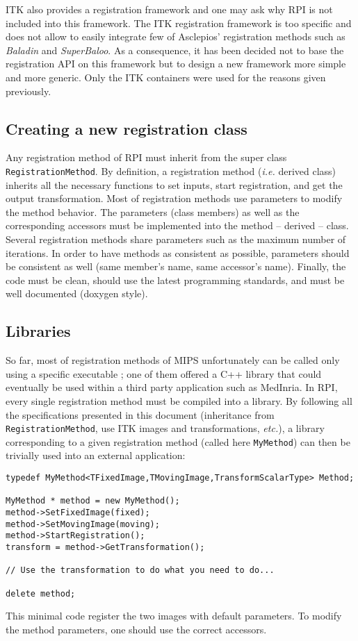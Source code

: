 ITK also provides a registration framework and one may ask why RPI is not included into this framework. The ITK registration framework is too specific and does not allow to easily integrate few of Asclepios' registration methods such as \textit{Baladin} and \textit{SuperBaloo}. As a consequence, it has been decided not to base the registration API on this framework but to design a new framework more simple and more generic. Only the ITK containers were used for the reasons given previously.



\subsection{Creating a new registration class}


Any registration method of RPI must inherit from the super class \texttt{RegistrationMethod}. By definition, a registration method (\textit{i.e.} derived class) inherits all the necessary functions to set inputs, start registration, and get the output transformation. Most of registration methods use parameters to modify the method behavior. The parameters (class members) as well as the corresponding accessors must be implemented into the method -- derived -- class. Several registration methods share parameters such as the maximum number of iterations. In order to have methods as consistent as possible, parameters should be consistent as well (same member's name, same accessor's name). Finally, the code must be clean, should use the latest programming standards, and must be well documented (doxygen style).



\subsection{Libraries}

So far, most of registration methods of MIPS unfortunately can be called only using a specific executable ; one of them offered a C++ library that could eventually be used within a third party application such as MedInria. In RPI, every single registration method must be compiled into a library. By following all the specifications presented in this document (inheritance from \texttt{RegistrationMethod}, use ITK images and transformations, \textit{etc.}), a library corresponding to a given registration method (called here \texttt{MyMethod}) can then be trivially used into an external application:
%
\begin{lstlisting}
typedef MyMethod<TFixedImage,TMovingImage,TransformScalarType> Method;

MyMethod * method = new MyMethod();
method->SetFixedImage(fixed);
method->SetMovingImage(moving);
method->StartRegistration();
transform = method->GetTransformation();

// Use the transformation to do what you need to do...

delete method;
\end{lstlisting}
%
This minimal code register the two images with default parameters. To modify the method parameters, one should use the correct accessors.



